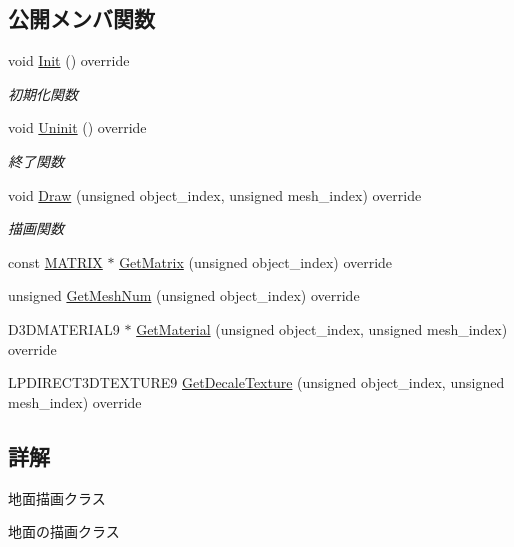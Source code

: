 \subsection*{公開メンバ関数}
\begin{DoxyCompactItemize}
\item 
void \mbox{\hyperlink{class_field_draw_a4287d2ce33033b2413c1d3a81b173373}{Init}} () override
\begin{DoxyCompactList}\small\item\em 初期化関数 \end{DoxyCompactList}\item 
void \mbox{\hyperlink{class_field_draw_a89a78212c141714d9e39e25e663aaeff}{Uninit}} () override
\begin{DoxyCompactList}\small\item\em 終了関数 \end{DoxyCompactList}\item 
void \mbox{\hyperlink{class_field_draw_a1915497654d079074dbd3e058db06a78}{Draw}} (unsigned object\+\_\+index, unsigned mesh\+\_\+index) override
\begin{DoxyCompactList}\small\item\em 描画関数 \end{DoxyCompactList}\item 
const \mbox{\hyperlink{_vector3_d_8h_a032295cd9fb1b711757c90667278e744}{M\+A\+T\+R\+IX}} $\ast$ \mbox{\hyperlink{class_field_draw_a2629b4c4cd8e240e39c65b879c6e82b6}{Get\+Matrix}} (unsigned object\+\_\+index) override
\item 
unsigned \mbox{\hyperlink{class_field_draw_aeb54d8cba559ef615ee46c8a7bbd3b9f}{Get\+Mesh\+Num}} (unsigned object\+\_\+index) override
\item 
D3\+D\+M\+A\+T\+E\+R\+I\+A\+L9 $\ast$ \mbox{\hyperlink{class_field_draw_ab126f938895211ff170bc37045a8e7a2}{Get\+Material}} (unsigned object\+\_\+index, unsigned mesh\+\_\+index) override
\item 
L\+P\+D\+I\+R\+E\+C\+T3\+D\+T\+E\+X\+T\+U\+R\+E9 \mbox{\hyperlink{class_field_draw_a67eabcc5ffd6697b87e89a1c4ddb95f6}{Get\+Decale\+Texture}} (unsigned object\+\_\+index, unsigned mesh\+\_\+index) override
\end{DoxyCompactItemize}


\subsection{詳解}
地面描画クラス 

地面の描画クラス 

